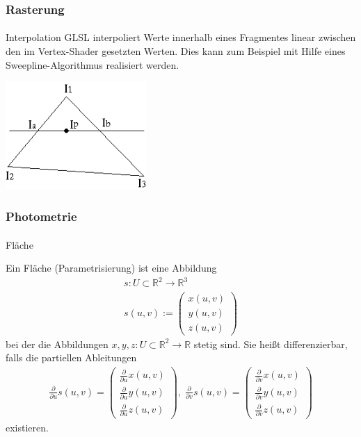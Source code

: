 \documentclass{beamer}
\begin{document}
\begin{frame}
    \frametitle{Rasterung}
\framesubtitle{}
\begin{block}{Interpolation}
GLSL interpoliert Werte innerhalb eines Fragmentes linear zwischen den im Vertex-Shader gesetzten Werten.
Dies kann  zum Beispiel mit Hilfe eines Sweepline-Algorithmus realisiert werden.
\begin{center}
    \includegraphics[width=0.4\textwidth]{images/gouraud_scanline.png}
\end{center}

\end{block}
\end{frame}



\begin{frame}
    \frametitle{Photometrie}
\framesubtitle{}
\begin{block}{Fläche}

Ein Fläche (Parametrisierung) ist  eine  Abbildung
\begin{align*}
s: U \subset \mathbb{R}^2 \to \mathbb{R}^3 \\
s(u,v) := \begin{pmatrix} x(u,v) \\ y(u,v) \\ z(u,v) \end{pmatrix} 
\end{align*} 
bei der die Abbildungen $x, y, z : U \subset \mathbb{R}^2 \to \mathbb{R}$ stetig sind. Sie heißt differenzierbar, falls die partiellen Ableitungen
\begin{align*}
\frac{\partial}{\partial u} s(u,v) = \begin{pmatrix}  \frac{\partial}{\partial u} x(u,v) \\  \frac{\partial}{\partial u} y(u,v) \\  \frac{\partial}{\partial u} z(u,v) \end{pmatrix}, \;
\frac{\partial}{\partial v} s(u,v) =  \begin{pmatrix} \frac{\partial}{\partial v} x(u,v) \\ \frac{\partial}{\partial v} y(u,v) \\ \frac{\partial}{\partial v} z(u,v) \end{pmatrix}
\end{align*}
existieren. 
\end{block}
\end{frame}
\end{document}
